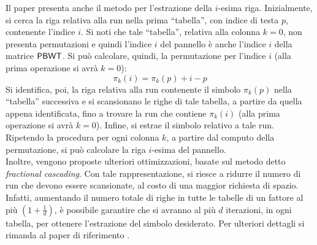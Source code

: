 Il paper presenta anche il metodo per l'estrazione della $i$-esima
riga. Inizialmente, si cerca la riga relativa alla run nella prima
``tabella'', 
con indice di testa $p$, contenente l'indice $i$. Si noti che tale
``tabella'', relativa alla colonna $k=0$, non presenta permutazioni e quindi  
l'indice $i$ del pannello è anche l'indice $i$ della matrice $\mbox{\rm {\sf PBWT}}$.
Si può calcolare, quindi, la permutazione per l'indice $i$ (alla prima
operazione si avrà $k=0$):
\begin{equation}
  \label{eq:pbwttrick2}
  \pi_k(i)=\pi_k(p)+i-p
\end{equation}
Si identifica, poi, la riga relativa alla run contenente il simbolo $\pi_k(p)$
nella ``tabella'' successiva e si scansionano le righe di tale tabella, a
partire da quella appena identificata, fino a trovare la run che contiene
$\pi_k(i)$ (alla prima
operazione si avrà $k=0$). Infine, si estrae il simbolo relativo a tale run.
Ripetendo la procedura per ogni colonna $k$, a partire dal computo della
permutazione, si 
può calcolare la riga $i$-esima del pannello.\\
Inoltre,
vengono proposte ulteriori ottimizzazioni, basate sul metodo detto
\textit{fractional cascading}. Con tale rappresentazione, si riesce a ridurre il
numero di run che devono essere scansionate, al costo di una
maggior richiesta di spazio. Infatti, aumentando il numero totale di
righe in tutte le tabelle di un fattore al più $\left(1+\frac{1}{d}\right)$, è
possibile garantire che si avranno al più $d$ iterazioni, in ogni tabella, per
ottenere l'estrazione del simbolo desiderato.
Per ulteriori dettagli si rimanda al paper di riferimento \cite{tricks}.
